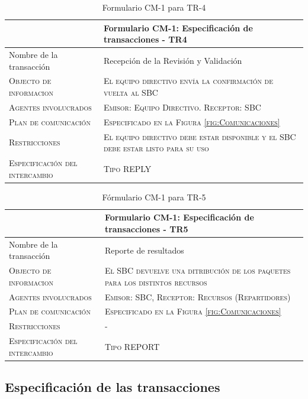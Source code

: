 \begin{table}[H]
  \scriptsize
  \begin{tabularx}{\textwidth}{|l|X|} \hline
    & \textbf{Formulario CM-1: Especificación de transacciones - TR4} \\
    \hline\hline
    {Nombre de la transacción} & Recepción de la Revisión y Validación\\
    \hline  
    \textsc{Objecto de informacion} & \textsc{El equipo directivo envía la confirmación de vuelta al SBC}\\ 
    \hline
    \textsc{Agentes involucrados} & \textsc{Emisor: Equipo Directivo. Receptor: SBC}\\ 
    \hline
    \textsc{Plan de comunicación} & \textsc{Especificado en la Figura \ref{fig:Comunicaciones}}\\ 
    \hline
    \textsc{Restricciones} & \textsc{El equipo directivo debe estar disponible y el SBC debe estar listo para su uso}\\ 
    \hline
    \textsc{Especificación del intercambio} & \textsc{Tipo REPLY}\\ 
    \hline
  \end{tabularx}
    \caption{\label{tab:TR4}Formulario CM-1 para TR-4}
\end{table}

\begin{table}[H]
  \scriptsize
  \begin{tabularx}{\textwidth}{|l|X|} \hline
    & \textbf{Formulario CM-1: Especificación de transacciones - TR5} \\
    \hline\hline
    {Nombre de la transacción} & Reporte de resultados\\
    \hline  
    \textsc{Objecto de informacion} & \textsc{El SBC devuelve una ditribución de los paquetes para los distintos recursos}\\ 
    \hline
    \textsc{Agentes involucrados} & \textsc{Emisor: SBC, Receptor: Recursos (Repartidores)}\\ 
    \hline
    \textsc{Plan de comunicación} & \textsc{Especificado en la Figura \ref{fig:Comunicaciones}}\\ 
    \hline
    \textsc{Restricciones} & \textsc{-}\\ 
    \hline
    \textsc{Especificación del intercambio} & \textsc{Tipo REPORT}\\ 
    \hline
  \end{tabularx}
    \caption{\label{tab:TR5}Fórmulario CM-1 para TR-5}
\end{table}


\subsection{Especificación de las transacciones}
